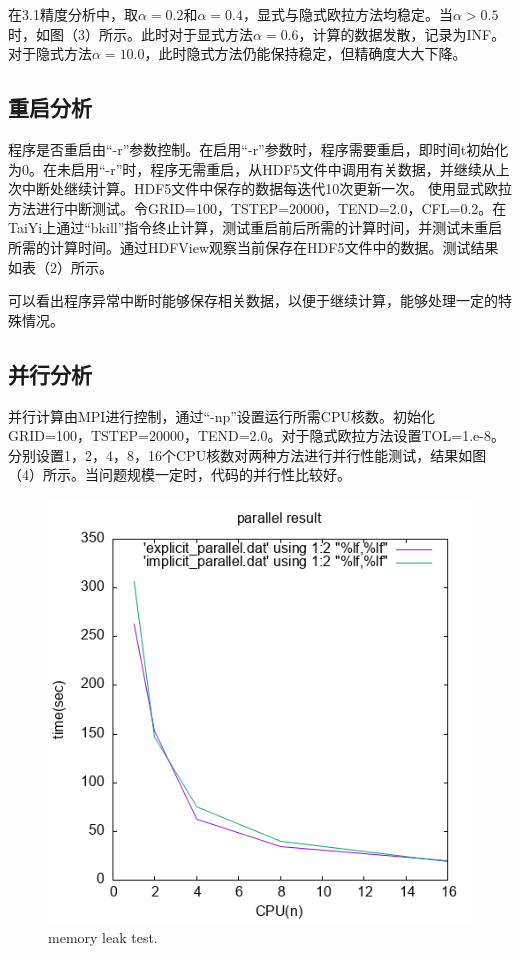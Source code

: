 \documentclass[final]{cvpr}
\begin{document}
在3.1精度分析中，取$\alpha=0.2$和$\alpha=0.4$，显式与隐式欧拉方法均稳定。当$\alpha>0.5$时，如图（3）所示。此时对于显式方法$\alpha=0.6$，计算的数据发散，记录为INF。对于隐式方法$\alpha=10.0$，此时隐式方法仍能保持稳定，但精确度大大下降。



\subsection{重启分析}

程序是否重启由“-r”参数控制。在启用“-r”参数时，程序需要重启，即时间t初始化为0。在未启用“-r”时，程序无需重启，从HDF5文件中调用有关数据，并继续从上次中断处继续计算。HDF5文件中保存的数据每迭代10次更新一次。
使用显式欧拉方法进行中断测试。令GRID=100，TSTEP=20000，TEND=2.0，CFL=0.2。在TaiYi上通过“bkill”指令终止计算，测试重启前后所需的计算时间，并测试未重启所需的计算时间。通过HDFView观察当前保存在HDF5文件中的数据。测试结果如表（2）所示。

可以看出程序异常中断时能够保存相关数据，以便于继续计算，能够处理一定的特殊情况。
\subsection{并行分析}
并行计算由MPI进行控制，通过“-np”设置运行所需CPU核数。初始化GRID=100，TSTEP=20000，TEND=2.0。对于隐式欧拉方法设置TOL=1.e-8。分别设置1，2，4，8，16个CPU核数对两种方法进行并行性能测试，结果如图（4）所示。当问题规模一定时，代码的并行性比较好。
\begin{figure}[htpb]
	\centering
	\includegraphics[scale=0.70]{./figures/parallel.png}
	\caption{memory leak test.}
	\label{figure}
\end{figure}
\end{document}
